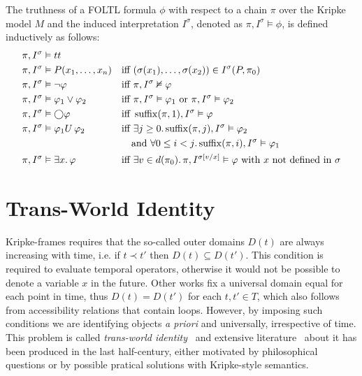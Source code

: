 \begin{definition}
  The truthness of a \ac{FOLTL} formula $\phi$ with respect to a chain $\pi$ over the Kripke model $M$ and the induced
  interpretation $I^\sigma$, denoted as $\pi, I^\sigma \vDash \phi$, is defined inductively as follows:
  \begin{align*}
    \pi, I^\sigma &\vDash tt && \\
    \pi, I^\sigma &\vDash P(x_1, \ldots, x_n) &&\text{iff } (\sigma(x_1), \ldots, \sigma(x_2)) \in I^\sigma(P, \pi_0) \\
    \pi, I^\sigma &\vDash \neg\varphi &&\text{iff } \pi, I^\sigma \nvDash \varphi \\
    \pi, I^\sigma &\vDash \varphi_1 \lor \varphi_2 &&\text{iff } \pi, I^\sigma \vDash \varphi_1 \text{ or } \pi, I^\sigma
      \vDash \varphi_2 \\
    \pi, I^\sigma &\vDash \bigcirc{\varphi} &&\text{iff } \operatorname{suffix}(\pi, 1), I^\sigma \vDash \varphi \\
    \pi, I^\sigma &\vDash {\varphi_1}U\,{\varphi_2} &&\text{iff } \exists {j \geq 0} \ldotp {\operatorname{suffix}(\pi, j), I^\sigma \vDash \varphi_2} \\
    &&&\quad\text{and } \forall {0 \leq i < j} \ldotp {\operatorname{suffix}(\pi, i), I^\sigma \vDash \varphi_1} \\
    \pi, I^\sigma &\vDash \exists {x} \ldotp {\varphi} &&\text{iff } \exists {v \in d(\pi_0)} \ldotp {\pi, I^{\sigma[v/x]} \vDash \varphi}
    \text{ with $x$ not defined in $\sigma$} \\
  \end{align*}
\end{definition}


\section{Trans-World Identity}

Kripke-frames requires that the so-called outer domains $D(t)$ are always increasing with time, i.e. if $t \prec t'$
then $D(t) \subseteq D(t')$. This condition is required to evaluate temporal operators, otherwise it would not be
possible to denote a variable $x$ in the future. Other works fix a universal domain equal for each point in time, thus
$D(t) = D(t')$ for each $t, t' \in T$, which also follows from accessibility relations that contain loops.  However, by
imposing such conditions we are identifying objects \emph{a priori} and universally, irrespective of time. This problem is
called \emph{trans-world identity}~\cite{lewis_counterpart_1968,lewis_plurality_2001} and extensive
literature~\cite{belardinelli_quantified_2021,plantinga_transworld_1978,kripke_naming_1998} about it has been produced
in the last half-century, either motivated by philosophical questions or by possible pratical solutions with Kripke-style semantics.

